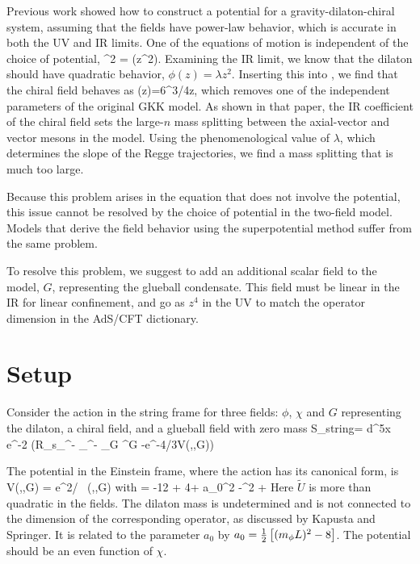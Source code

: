 Previous work showed how to construct a potential for a gravity-dilaton-chiral system, assuming that the fields have power-law behavior, which is accurate in both the UV and IR limits. One of the equations of motion is independent of the choice of potential,
\be
\chidot^2  =  \Dz(z^2\phidot). 
\label{twofield}
\ee
Examining the IR limit, we know that the dilaton should have quadratic behavior, $\phi(z)=\lambda z^2$. Inserting this into \label{twofield}, we find that the chiral field behaves as
\be
\chi(z)=6^{3/4}\sqrt{\lambda}z,
\ee
which removes one of the independent parameters of the original GKK model. As shown in that paper, the IR coefficient of the chiral field sets the large-$n$ mass splitting between the axial-vector and vector mesons in the model. Using the phenomenological value of $\lambda$, which determines the slope of the Regge trajectories, we find a mass splitting that is much too large.

Because this problem arises in the equation that does not involve the potential, this issue cannot be resolved by the choice of potential in the two-field model. Models that derive the field behavior using the superpotential method suffer from the same problem.

To resolve this problem, we suggest to add an additional scalar field to the model, $G$, representing the glueball condensate. This field must be linear in the IR for linear confinement, and go as $z^4$ in the UV to match the operator dimension in the AdS/CFT dictionary.

\section{Setup}
Consider the action in the string frame for three fields: $\phi$, $\chi$ and $G$ representing the dilaton, a chiral field, and a glueball field with zero mass
\be
S_{string}= \int d^5x \root e^{-2\Phi} \left(R_s\partial_\mu\Phi\partial^\mu\Phi - \thalf\partial_\mu\chi\partial^\mu\chi - \thalf\partial_\mu G \partial^\mu G -e^{-4\Phi/3}V(\phi,\chi,G)\right)
\ee

The potential in the Einstein frame, where the action has its canonical form, is
\be
V(\phi,\chi,G) = {\rm e}^{2\phi/} \, (\phi,\chi,G)
\ee
with
\be
{} = -12 + 4\phi + a_0\phi^2 -\tthalf\chi^2 + 
\label{V}
\ee
Here $\tilde{U}$ is more than quadratic in the fields.  The dilaton mass is undetermined and is not connected to the dimension of the corresponding operator, as discussed by Kapusta and Springer.  It is related to the parameter $a_0$ by $a_0 = \thalf \left[ \mL2-8 \right]$. The potential should be an even function of $\chi$. 

